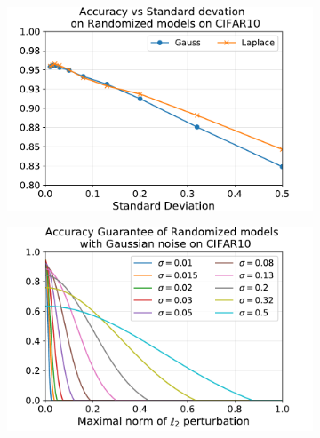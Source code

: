 \begin{figure}[htb]
  \centering
  \begin{subfigure}[t]{0.31\textwidth}
      \centering
      \includegraphics[scale=0.32]{figures/appendix/ap3-randomized_inference/acc_sd_CIFAR10.pdf}
      \caption{}
      \label{figure:ap3-acc_sd_CIFAR10}
  \end{subfigure}
  \begin{subfigure}[t]{0.31\textwidth}
      \centering
      \includegraphics[scale=0.32]{figures/appendix/ap3-randomized_inference/gauss_certif_CIFAR10.pdf}
      \caption{}
      \label{figure:ap3-gauss_certif_CIFAR10}
  \end{subfigure}
  \begin{subfigure}[t]{0.31\textwidth}
      \centering

\end{subfigure}
\end{figure}
